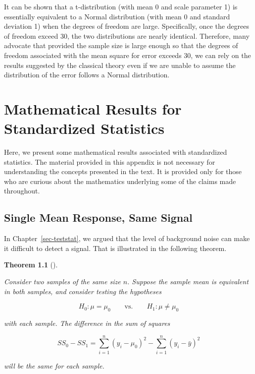 \documentclass[
  letterpaper,
  DIV=11,
  numbers=noendperiod]{scrreprt}
\theoremstyle{definition}
\theoremstyle{definition}
\theoremstyle{plain}
\newtheorem{theorem}{Theorem}[chapter]
\theoremstyle{remark}
\begin{document}
It can be shown that a t-distribution (with mean 0 and scale parameter
1) is essentially equivalent to a Normal distribution (with mean 0 and
standard deviation 1) when the degrees of freedom are large.
Specifically, once the degrees of freedom exceed 30, the two
distributions are nearly identical. Therefore, many advocate that
provided the sample size is large enough so that the degrees of freedom
associated with the mean square for error exceeds 30, we can rely on the
results suggested by the classical theory even if we are unable to
assume the distribution of the error follows a Normal distribution.

\hypertarget{sec-app-teststat}{%
\chapter{Mathematical Results for Standardized
Statistics}\label{sec-app-teststat}}

Here, we present some mathematical results associated with standardized
statistics. The material provided in this appendix is not necessary for
understanding the concepts presented in the text. It is provided only
for those who are curious about the mathematics underlying some of the
claims made throughout.

\hypertarget{single-mean-response-same-signal}{%
\section{Single Mean Response, Same
Signal}\label{single-mean-response-same-signal}}

In Chapter~\ref{sec-teststat}, we argued that the level of background
noise can make it difficult to detect a signal. That is illustrated in
the following theorem.

\begin{theorem}[]\protect\hypertarget{thm-app-teststat-same-signal}{}\label{thm-app-teststat-same-signal}

Consider two samples of the same size \(n\). Suppose the sample mean is
equivalent in both samples, and consider testing the hypotheses

\[H_0: \mu = \mu_0 \qquad \text{vs.} \qquad H_1: \mu \neq \mu_0\]

with each sample. The difference in the sum of squares

\[SS_0 - SS_1 = \sum_{i=1}^{n} \left(y_i - \mu_0\right)^2 - \sum_{i=1}^{n} \left(y_i - \bar{y}\right)^2\]

will be the same for each sample.

\end{theorem}
\end{document}
